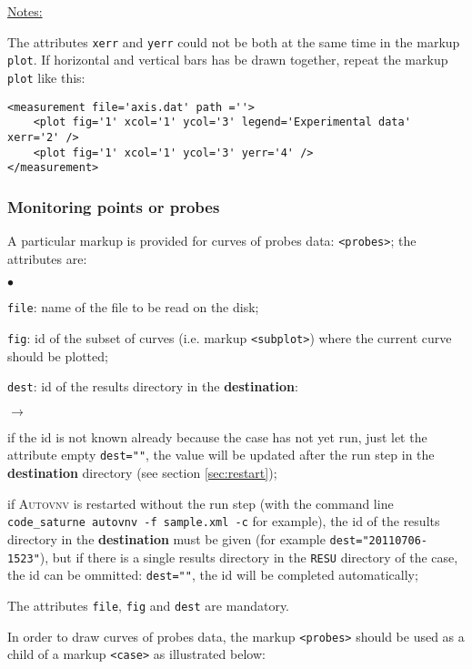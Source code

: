 \documentclass[a4paper,10pt,twoside]{csshortdoc}
\begin{document}
\underline{Notes:}

The attributes \texttt{xerr} and \texttt{yerr} could not be both at the same
time in the markup \texttt{plot}. If horizontal and vertical bars has be
drawn together, repeat the markup \texttt{plot} like this:
\small
\begin{verbatim}
<measurement file='axis.dat' path =''>
    <plot fig='1' xcol='1' ycol='3' legend='Experimental data' xerr='2' />
    <plot fig='1' xcol='1' ycol='3' yerr='4' />
</measurement>
\end{verbatim}
\normalsize

\subsubsection{Monitoring points or probes}

A particular markup is provided for curves of probes data:
\texttt{<probes>}; the attributes are:

\begin{list}{$\bullet$}{}
\item \texttt{file}: name of the file to be read on the disk;
\item \texttt{fig}: id of the subset of curves (i.e. markup \texttt{<subplot>})
where the current curve should be plotted;
\item \texttt{dest}: id of the results directory in the \textbf{destination}:
\begin{list}{$\rightarrow$}{}
\item if the id is not known already because the case has not yet run, just let
the attribute empty \texttt{dest=""}, the value will be updated after the run
step in the \textbf{destination} directory (see section \ref{sec:restart});
\item if \textsc{Autovnv} is restarted without the run step (with the command
line \texttt{code\_saturne autovnv -f sample.xml -c} for example), the id of
the results directory in the \textbf{destination} must be given (for example
\texttt{dest="20110706-1523"}), but if there is a single results directory in
the \texttt{RESU} directory of the case, the id can be ommitted:
\texttt{dest=""}, the id will be completed automatically;
\end{list}
\end{list}

The attributes \texttt{file}, \texttt{fig} and \texttt{dest} are mandatory.

In order to draw curves of probes data, the markup \texttt{<probes>}
should be used as a child of a markup \texttt{<case>} as illustrated below:
\end{document}
